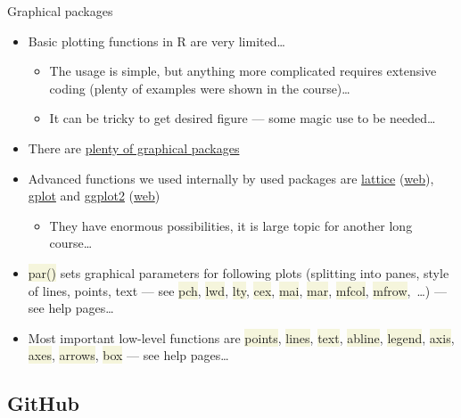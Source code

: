 \documentclass[compress, ucs, xelatex, 11pt, xcolor=svgnames, aspectratio=169,
	hyperref={
		bookmarks=true,
		unicode=true,
		colorlinks=true,
		pdftitle={Molecular data in R},
		plainpages=false,
		pdfauthor={Vojtech Zeisek},
		pdfsubject={Course about phylogeny and evolution in R},
		pdfcreator={XeLaTeX},
		pdfkeywords={R, evolution, phylogeny, molecular data},
		linkcolor=Crimson, %
		anchorcolor=Magenta, %
		citecolor=Magenta, %
		filecolor=Magenta, %
		menucolor=Magenta, %
		urlcolor=DodgerBlue, %
		pdftex},
	url={hyphens, lowtilde} %
	]{beamer}
\renewcommand{\texttt}[1]{\colorbox{Beige}{{\ttfamily #1}}}
\begin{document}
\begin{frame}{Graphical packages}
	\begin{itemize}
		\item Basic plotting functions in R are very limited\ldots
		\begin{itemize}
			\item The usage is simple, but anything more complicated requires extensive coding (plenty of examples were shown in the course)\ldots
			\item It can be tricky to get desired figure --- some magic use to be needed\ldots
		\end{itemize}
		\item There are \href{https://CRAN.R-project.org/web/views/Graphics.html}{plenty of graphical packages}
		\item Advanced functions we used internally by used packages are \href{https://CRAN.R-project.org/package=lattice}{lattice} (\href{http://lattice.r-forge.r-project.org/}{web}), \href{https://CRAN.R-project.org/package=gplots}{gplot} and \href{https://CRAN.R-project.org/package=ggplot2}{ggplot2} (\href{https://ggplot2.tidyverse.org/}{web})
		\begin{itemize}
			\item They have enormous possibilities, it is large topic for another long course\ldots
		\end{itemize}
		\item \texttt{par()} sets graphical parameters for following plots (splitting into panes, style of lines, points, text --- see \texttt{pch}, \texttt{lwd}, \texttt{lty}, \texttt{cex}, \texttt{mai}, \texttt{mar}, \texttt{mfcol}, \texttt{mfrow},~\ldots) --- see help pages\ldots
		\item Most important low-level functions are \texttt{points}, \texttt{lines}, \texttt{text}, \texttt{abline}, \texttt{legend}, \texttt{axis}, \texttt{axes}, \texttt{arrows}, \texttt{box} --- see help pages\ldots
	\end{itemize}
\end{frame}

\subsection{GitHub}
\end{document}
